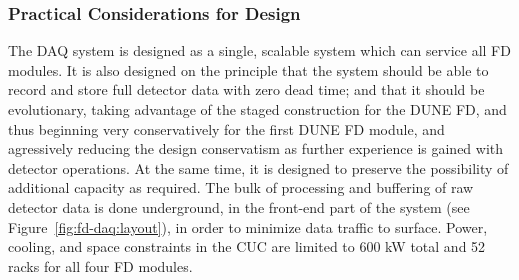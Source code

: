 
 

\subsubsection{Practical Considerations for Design}

The DAQ system is designed as a single, scalable system which can service
all FD modules. It is also designed on the principle that the system should be
able to record and store full detector data with zero dead time; and
that it should be evolutionary, taking advantage of the staged
construction for the DUNE FD, and thus beginning very conservatively
for the first DUNE FD module, and agressively reducing the design
conservatism as further experience is gained with detector
operations. At the same time, it is designed to preserve the possibility of additional capacity
as required. The bulk of processing and buffering of raw detector data is
done underground, in the front-end part of the system (see Figure~\ref{fig:fd-daq:layout}), in order to
minimize data traffic to surface. Power, cooling, and space
constraints in the CUC are limited to 600 kW total and 52 racks for all four FD
modules.

